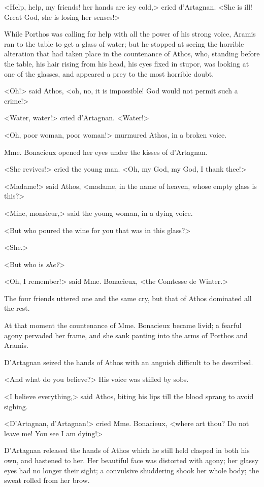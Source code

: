 <Help, help, my friends! her hands are icy cold,> cried d'Artagnan. <She is ill! Great God, she is losing her senses!> 

While Porthos was calling for help with all the power of his strong voice, Aramis ran to the table to get a glass of water; but he stopped at seeing the horrible alteration that had taken place in the countenance of Athos, who, standing before the table, his hair rising from his head, his eyes fixed in stupor, was looking at one of the glasses, and appeared a prey to the most horrible doubt. 

<Oh!> said Athos, <oh, no, it is impossible! God would not permit such a crime!> 

<Water, water!> cried d'Artagnan. <Water!> 

<Oh, poor woman, poor woman!> murmured Athos, in a broken voice. 

Mme. Bonacieux opened her eyes under the kisses of d'Artagnan. 

<She revives!> cried the young man. <Oh, my God, my God, I thank thee!> 

<Madame!> said Athos, <madame, in the name of heaven, whose empty glass is this?> 

<Mine, monsieur,> said the young woman, in a dying voice. 

<But who poured the wine for you that was in this glass?> 

<She.> 

<But who is \textit{she?}> 

<Oh, I remember!> said Mme. Bonacieux, <the Comtesse de Winter.> 

The four friends uttered one and the same cry, but that of Athos dominated all the rest. 

At that moment the countenance of Mme. Bonacieux became livid; a fearful agony pervaded her frame, and she sank panting into the arms of Porthos and Aramis. 

D'Artagnan seized the hands of Athos with an anguish difficult to be described. 

<And what do you believe?> His voice was stifled by sobs. 

<I believe everything,> said Athos, biting his lips till the blood sprang to avoid sighing. 

<D'Artagnan, d'Artagnan!> cried Mme. Bonacieux, <where art thou? Do not leave me! You see I am dying!> 

D'Artagnan released the hands of Athos which he still held clasped in both his own, and hastened to her. Her beautiful face was distorted with agony; her glassy eyes had no longer their sight; a convulsive shuddering shook her whole body; the sweat rolled from her brow. 

